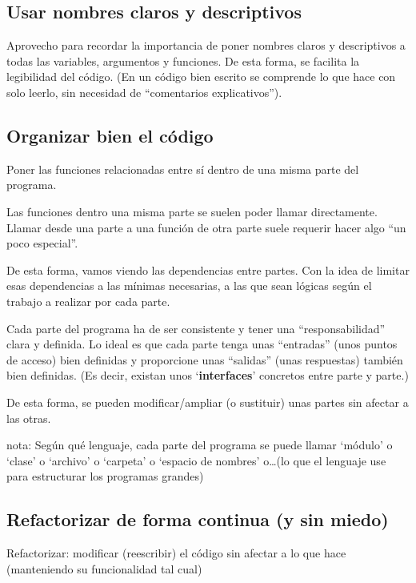 \documentclass[spanish,12pt,a4paper,final,oneside]{book}
\begin{document}
\subsection{Usar nombres claros y descriptivos}

Aprovecho para recordar la importancia de poner nombres claros y descriptivos a todas las variables, argumentos y funciones. De esta forma, se facilita la legibilidad del código. (En un código bien escrito se comprende lo que hace con solo leerlo, sin necesidad de ``comentarios explicativos'').


\subsection{Organizar bien el código}

Poner las funciones relacionadas entre sí dentro de una misma parte del programa.

Las funciones dentro una misma parte se suelen poder llamar directamente. Llamar desde una parte a una función de otra parte suele requerir hacer algo ``un poco especial''.

De esta forma, vamos viendo las dependencias entre partes. Con la idea de limitar esas dependencias a las mínimas necesarias, a las que sean lógicas según el trabajo a realizar por cada parte.

Cada parte del programa ha de ser consistente y tener una ``responsabilidad'' clara y definida. Lo ideal es que cada parte tenga unas ``entradas'' (unos puntos de acceso) bien definidas y proporcione unas ``salidas'' (unas respuestas) también bien definidas. (Es decir, existan unos `\textbf{interfaces}' concretos entre parte y parte.)

De esta forma, se pueden modificar/ampliar (o sustituir) unas partes sin afectar a las otras.

\vspace{0.5cm}
nota: Según qué lenguaje, cada parte del programa se puede llamar `módulo' o `clase' o `archivo' o `carpeta' o `espacio de nombres' o\ldots (lo que el lenguaje use para estructurar los programas grandes)


\subsection{Refactorizar de forma continua (y sin miedo)}

Refactorizar: modificar (reescribir) el código sin afectar a lo que hace (manteniendo su funcionalidad tal cual)
\end{document}
